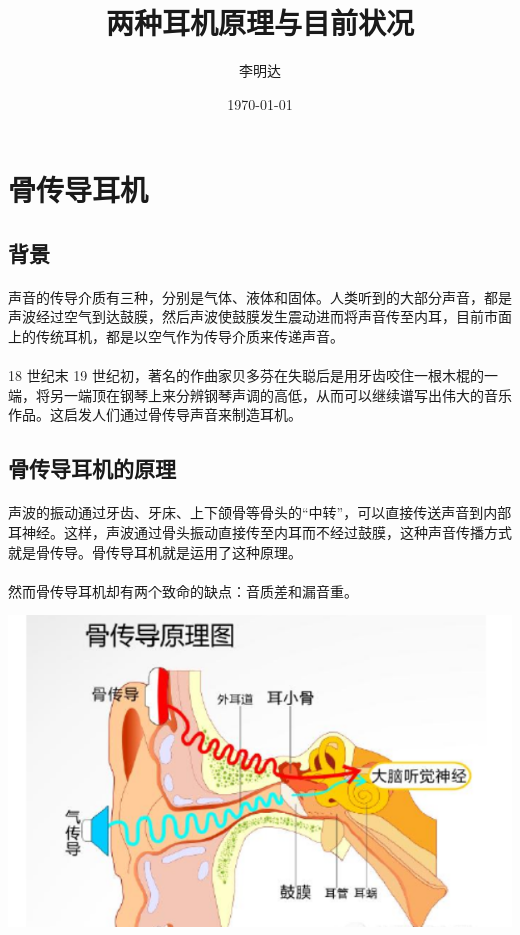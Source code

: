 \documentclass{ctexart}
\title{两种耳机原理与目前状况}
\author{李明达}
\date{\today}
\begin{document}
\maketitle
\section{骨传导耳机}

\subsection{背景}
\paragraph{}
声音的传导介质有三种，分别是气体、液体和固体。人类听到的大部分声音，都是声波经过空气到达鼓膜，然后声波使鼓膜发生震动进而将声音传至内耳，目前市面上的传统耳机，都是以空气作为传导介质来传递声音。
\paragraph{}
18 世纪末 19 世纪初，著名的作曲家贝多芬在失聪后是用牙齿咬住一根木棍的一端，将另一端顶在钢琴上来分辨钢琴声调的高低，从而可以继续谱写出伟大的音乐作品。这启发人们通过骨传导声音来制造耳机。
\subsection{骨传导耳机的原理}
\paragraph{}
声波的振动通过牙齿、牙床、上下颌骨等骨头的“中转”，可以直接传送声音到内部耳神经。这样，声波通过骨头振动直接传至内耳而不经过鼓膜，这种声音传播方式就是骨传导。骨传导耳机就是运用了这种原理。
\paragraph{}
然而骨传导耳机却有两个致命的缺点：音质差和漏音重。

\includegraphics[width = .8\textwidth]{a.png}
\end{document}
